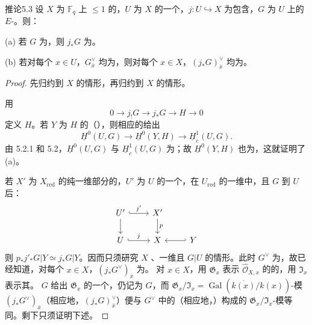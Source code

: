 \begin{SGAresult}{推论}{5.3}
设 $X$ 为 $\mathbb F_q$ 上 $\leq1$ 的，$U$ 为 $X$ 的一个，$j:U\hookrightarrow X$ 为包含，$G$ 为 $U$ 上的 $E$-。则：

\textup{(a)} 若 $G$ 为，则 $j_*G$ 为。

\textup{(b)} 若对每个 $x\in U$，$G_{\bar x}^\vee$ 均为，则对每个 $x\in X$，$(j_*G)_{\bar x}^\vee$ 均为。
\end{SGAresult}
\begin{proof}
先归约到 $X$ 的情形，再归约到 $X$ 的情形。

用
\[
0\longrightarrow j_!G\longrightarrow j_*G\longrightarrow H\longrightarrow0
\]
定义 $H$。若 $Y$ 为 $H$ 的（），则相应的给出
\[
\underline H^0(U,G)\longrightarrow\underline H^0(Y,H)\longrightarrow\underline H_c^1(U,G).
\]
由 5.2.1 和 5.2，$\underline H^0(U,G)$ 与 $\underline H_c^1(U,G)$ 为；故 $\underline H^0(Y,H)$ 也为，这就证明了 (a)。

若 $X'$ 为 $X_{\mathrm{red}}$ 的纯一维部分的，$U'$ 为 $U$ 的一个，在 $U_{\mathrm{red}}$ 的一维中，且 $G$ 到 $U$ 后：
\[
\begin{tikzcd}
U'\arrow[r,hook,"j'"]\arrow[d]&X'\arrow[d,"p"]&\\
U\arrow[r,hook,"j"]&X&Y\arrow[l,hook']
\end{tikzcd}
\]
则 $p_*j'_*G|Y\simeq j_*G|Y$。因而只须研究 $X$ 、一维且 $G|U$ 的情形。此时 $G^\vee$ 为，故已经知道，对每个 $x\in X$，$(j_*G^\vee)_{\bar x}$ 为。
对 $x\in X$，用 $\mathfrak G_x$ 表示 $\widehat{\mathcal O}_{X,x}$ 的的，用 $\mathfrak I_x$ 表示其。 $G$ 给出 $\mathfrak G_x$ 的一个，仍记为 $G$，而 $\mathfrak G_x/\mathfrak I_x=\operatorname{Gal}(\overline{k(x)}/k(x))$-模 $(j_*G^\vee)_{\bar x}$（相应地，$(j_*G)_{\bar x}^\vee$）便与 $G^\vee$ 中的（相应地，）构成的 $\mathfrak G_x/\mathfrak I_x$-模等同。剩下只须证明下述。
\end{proof}

